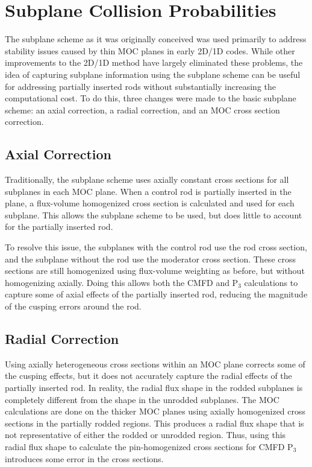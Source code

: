 \section{Subplane Collision Probabilities}

The subplane scheme as it was originally conceived was used primarily to address stability issues caused by thin MOC planes in early 2D/1D codes.  While other improvements to the 2D/1D method have largely eliminated these problems, the idea of capturing subplane information using the subplane scheme can be useful for addressing partially inserted rods without substantially increasing the computational cost.  To do this, three changes were made to the basic subplane scheme: an axial correction, a radial correction, and an MOC cross section correction.

\subsection{Axial Correction}

Traditionally, the subplane scheme uses axially constant cross sections for all subplanes in each MOC plane.  When a control rod is partially inserted in the plane, a flux-volume homogenized cross section is calculated and used for each subplane.  This allows the subplane scheme to be used, but does little to account for the partially inserted rod.

To resolve this issue, the subplanes with the control rod use the rod cross section, and the subplane without the rod use the moderator cross section.  These cross sections are still homogenized using flux-volume weighting as before, but without homogenizing axially.  Doing this allows both the CMFD and P$_3$ calculations to capture some of axial effects of the partially inserted rod, reducing the magnitude of the cusping errors around the rod.

\subsection{Radial Correction}

Using axially heterogeneous cross sections within an MOC plane corrects some of the cusping effects, but it does not accurately capture the radial effects of the partially inserted rod.  In reality, the radial flux shape in the rodded subplanes is completely different from the shape in the unrodded subplanes.  The MOC calculations are done on the thicker MOC planes using axially homogenized cross sections in the partially rodded regions.  This produces a radial flux shape that is not representative of either the rodded or unrodded region.  Thus, using this radial flux shape to calculate the pin-homogenized cross sections for CMFD P$_3$ introduces some error in the cross sections.

